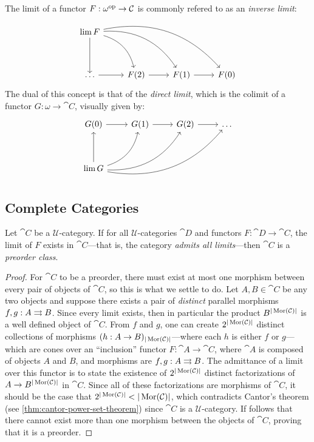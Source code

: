 \begin{example}
\label{exp:inv-dir-limit}
The limit of a functor \(F: \omega^{\mathrm{op}} \to \mathcal C\) is commonly refered to as
an \emph{inverse limit}:
\[
\begin{tikzcd}
\Lim F \ar[dd] \ar[drd, bend left] \ar[drdr, bend left] \ar[rdrdr, bend left]
&&& \\
&&& \\
\dots \ar[r] &F(2) \ar[r] &F(1) \ar[r] &F(0)
\end{tikzcd}
\]
The dual of this concept is that of the \emph{direct limit}, which is the
colimit of a functor \(G: \omega \to \cat C\), visually given by:
\[
\begin{tikzcd}
G(0) \ar[r] &G(1) \ar[r] &G(2) \ar[r] &\dots \\
&&&\\
\Lim G \ar[uu] \ar[uru, bend right] \ar[urur, bend right] \ar[rurur, bend right]
&&&
\end{tikzcd}
\]
\end{example}

\subsection{Complete Categories}

\begin{proposition}
\label{prop:all-limits-is-preorder}
Let \(\cat C\) be a \(\mathcal{U}\)-category. If for all
\(\mathcal{U}\)-categories \(\cat D\) and functors \(F: \cat D \to \cat C\), the
limit of \(F\) exists in \(\cat C\)---that is, the category \emph{admits all
  limits}---then \(\cat C\) is a \emph{preorder class}.
\end{proposition}

\begin{proof}
For \(\cat C\) to be a preorder, there must exist at most one morphism between
every pair of objects of \(\cat C\), so this is what we settle to do. Let
\(A, B \in \cat C\) be any two objects and suppose there exists a pair of
\emph{distinct} parallel morphisms \(f, g: A \rightrightarrows B\). Since every limit
exists, then in particular the product \(B^{|\operatorname{Mor}(\mathcal C)|}\) is a well defined
object of \(\cat C\). From \(f\) and \(g\), one can create
\(2^{|\operatorname{Mor}(\mathcal C)|}\) distinct collections of morphisms
\((h: A \to B)_{|\operatorname{Mor}(\mathcal C)|}\)---where each \(h\) is either \(f\) or
\(g\)---which are cones over an ``inclusion'' functor \(F: \cat A \to \cat C\),
where \(\cat A\) is composed of objects \(A\) and \(B\), and morphisms are
\(f, g: A \rightrightarrows B\). The admittance of a limit over this functor is to state the
existence of \(2^{|\operatorname{Mor}(\mathcal C)|}\) distinct factorizations of
\(A \to B^{|\operatorname{Mor}(\mathcal C)|}\) in \(\cat C\). Since all of these factorizations
are morphisms of \(\cat C\), it should be the case that
\(2^{|\operatorname{Mor}(\mathcal C)|} < |\operatorname{Mor}(\mathcal C)|\), which contradicts Cantor's theorem (see
\cref{thm:cantor-power-set-theorem}) since \(\cat C\) is a
\(\mathcal{U}\)-category. If follows that there cannot exist more than one
morphism between the objects of \(\cat C\), proving that it is a preorder.
\end{proof}

